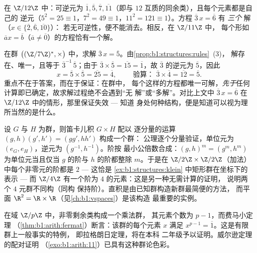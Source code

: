 \begin{example}[在 $\Z/n\Z$ 中计算]\label{ex:b1:structures:zncomputation}
在 $\Z/12\Z$ 中：可逆元为 $\overline 1, \overline 5, \overline 7,
\overline{11}$（即与 $12$ 互质的同余类），且每个元素都是自己的
逆元（$5^2 = 25 \equiv 1$，$7^2 = 49 \equiv 1$，$11^2 = 121 \equiv
1$）。方程 $\overline 3\, x = \overline 6$ 有 \emph{三个}
解（$x \in \{\overline 2, \overline 6, \overline{10}\}$）：
若无可逆性，便不能消去。相反，在 $\Z/11\Z$ 中，
每个形如 $\overline a x = \overline b$（$\overline a \neq
\overline 0$）的方程恰有一个解。
\end{example}

\begin{example}[群公理作为求解的保证]\label{ex:b1:structures:solving}
在群 $\bigl((\Z/7\Z)^*, \times\bigr)$ 中，求解 $\overline
3\,x = \overline 5$。由\cref{prop:b1:structures:rules}~(3)，
解存在、唯一，且等于 $\overline3^{-1}\,
\overline5$；由于 $\overline3 \times \overline5 = \overline{15}
= \overline1$，故 $\overline 3$ 的逆元为 $\overline 5$，因此
\[
x = \overline5 \times \overline5 = \overline{25} = \overline4,
\qquad\text{ 验算： } \overline3 \times \overline4 =
\overline{12} = \overline5 .
\]
重点不在于答案，而在于保证：在群中，
每个这样的方程都唯一可解，\emph{先于}任何
计算即已确定，故求解过程绝不会遇到“无
解”或“多解”。对比上文中 $\overline3\,x = \overline6$
在 $\Z/12\Z$ 中的情形，那里保证失效 --- 知道
身处何种结构，便是知道可以视为理所当然的是什么。
\end{example}

\begin{example}[直积]\label{ex:b1:structures:product}
设 $G$ 与 $H$ 为群，则笛卡儿积 $G \times H$ 配以
逐分量的运算 $(g, h)(g', h') = (gg', hh')$ 构成一个群：
公理逐个分量验证，单位元为
$(e_G, e_H)$，逆元为 $(g^{-1}, h^{-1})$。阶按
最小公倍数合成：$(g, h)^m = (g^m, h^m)$ 为单位元当且仅当
$g$ 的阶与 $h$ 的阶都整除 $m$。于是在 $\Z/2\Z
\times \Z/2\Z$（加法）中每个非零元的阶都是 $2$
--- 这恰是
\cref{ex:b1:structures:klein} 中矩形群在坐标下的表示 --- 而 $\Z/4\Z$
有一个阶为 $4$ 的元素：这是另一种无需计算的证明，
说明两个 $4$ 元群不同构（同构
保持阶）。直积是由已知群构造新群最简便的方法，
而平面 $\R^2 = \R \times
\R$（见\cref{ch:b1:vspaces}）是该构造
最重要的实例。
\end{example}

\begin{remark}[从结构看费马定理]
在域 $\Z/p\Z$ 中，非零剩余类构成一个乘法群，
其元素个数为 $p - 1$，而费马小定理
（\cref{thm:b1:arith:fermat}）断言：该群的每个元素 $x$
满足 $x^{p-1} = \overline 1$。这是有限群上一般事实的特例，
即拉格朗日定理，将在本科
二年级予以证明。威尔逊定理的配对证明
（\cref{exo:b1:arith:11}）已具有这种群论色彩。
\end{remark}

